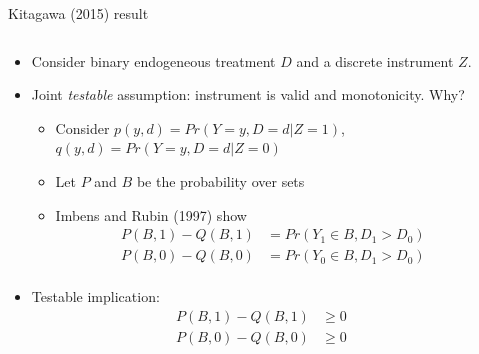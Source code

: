 \documentclass[notes,11pt, aspectratio=169]{beamer}
\begin{document}
\begin{frame}{Kitagawa (2015) result}
  \begin{columns}[onlytextwidth, T] %
    \begin{column}{.5\textwidth}
      \begin{itemize}
      \item Consider binary endogeneous treatment $D$ and a discrete instrument $Z$.
      \item Joint \emph{testable} assumption: instrument is valid and monotonicity. Why?
        \begin{itemize}
        \item Consider $p(y,d) = Pr(Y = y, D = d | Z = 1)$, $q(y,d) = Pr(Y = y, D = d | Z = 0)$
        \item Let $P$ and $B$ be the probability over sets
        \item Imbens and Rubin (1997) show
          \vspace{-10pt}
          \begin{align*}
            P(B, 1) - Q(B,1) &= Pr(Y_{1} \in B, D_{1} > D_{0})\\
            P(B, 0) - Q(B,0) &= Pr(Y_{0} \in B, D_{1} > D_{0})\\                        
          \end{align*}
        \end{itemize}
        \vspace{-10pt}                
      \item Testable implication:
          \vspace{-10pt}        
          \begin{align*}
            P(B, 1) - Q(B,1) &\geq 0\\
            P(B, 0) - Q(B,0) &\geq 0
          \end{align*}
      \end{itemize}
    \end{column}%
    \hfill%
    \begin{column}{.5\textwidth}

\end{column}
\end{columns}
\end{frame}
\end{document}
